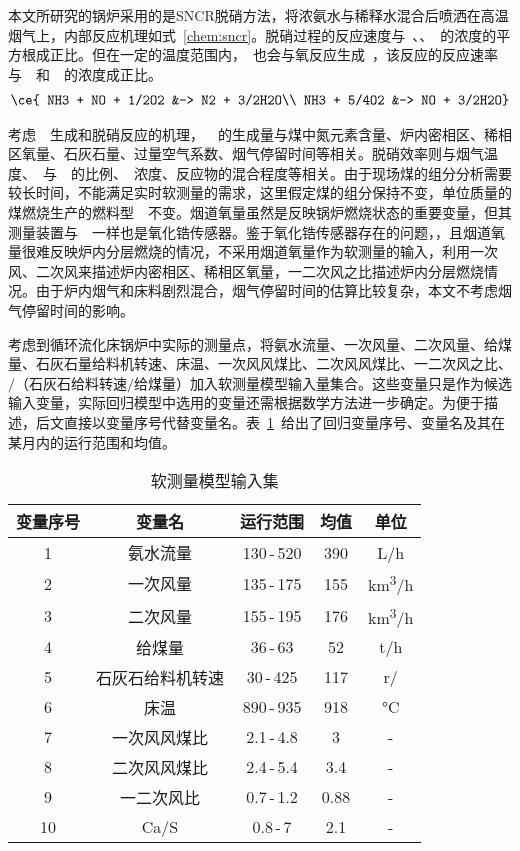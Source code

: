 本文所研究的锅炉采用的是SNCR脱硝方法，将浓氨水与稀释水混合后喷洒在高温烟气上，内部反应机理如式~\ref{chem:sncr}。脱硝过程的反应速度与~、、~的浓度的平方根成正比。但在一定的温度范围内，~也会与氧反应生成~，该反应的反应速率与~~和~~的浓度成正比。
\begin{align}
\label{chem:sncr}
\begin{split}
\ce{
NH3 + NO + 1/2O2 &-> N2 + 3/2H2O\\
NH3 + 5/4O2 &-> NO + 3/2H2O}
\end{split}
\end{align}

考虑~~生成和脱硝反应的机理，~~的生成量与煤中氮元素含量、炉内密相区、稀相区氧量、石灰石量、过量空气系数、烟气停留时间等相关。脱硝效率则与烟气温度、~与~~的比例、~浓度、反应物的混合程度等相关。由于现场煤的组分分析需要较长时间，不能满足实时软测量的需求，这里假定煤的组分保持不变，单位质量的煤燃烧生产的燃料型~~不变。烟道氧量虽然是反映锅炉燃烧状态的重要变量，但其测量装置与~~一样也是氧化锆传感器。鉴于氧化锆传感器存在的问题，，且烟道氧量很难反映炉内分层燃烧的情况，不采用烟道氧量作为软测量的输入，利用一次风、二次风来描述炉内密相区、稀相区氧量，一二次风之比描述炉内分层燃烧情况。由于炉内烟气和床料剧烈混合，烟气停留时间的估算比较复杂，本文不考虑烟气停留时间的影响。

考虑到循环流化床锅炉中实际的测量点，将氨水流量、一次风量、二次风量、给煤量、石灰石量给料机转速、床温、一次风风煤比、二次风风煤比、一二次风之比、$/$（石灰石给料转速$/$给煤量）加入软测量模型输入量集合。这些变量只是作为候选输入变量，实际回归模型中选用的变量还需根据数学方法进一步确定。为便于描述，后文直接以变量序号代替变量名。表~\ref{tab:nox_input}~给出了回归变量序号、变量名及其在某月内的运行范围和均值。

\begingroup
\renewcommand*{\arraystretch}{1.67}
\begin{table}[!h]
\small
\centering
\caption[软测量模型输入集]{软测量模型输入集} \label{tab:nox_input}
\begin{tabular}{ccccc}
\hline\hline 
变量序号	&变量名	&运行范围	&均值	&单位\\
\hline
1	&氨水流量&	130$\,$-$\,$520&	390	&\si{L/h}\\
2	&一次风量&135$\,$-$\,$175	&155	&\si{km^3/h}\\
3	&二次风量&	155$\,$-$\,$195	&176	&\si{km^3/h}\\
4	&给煤量	&36$\,$-$\,$63	&52	&\si{t/h}\\
5	&石灰石给料机转速	&30$\,$-$\,$425	&117	&\si{r/\min}\\
6	&床温	&890$\,$-$\,$935	&918	&\si{\degreeCelsius}\\
7	&一次风风煤比	&2.1$\,$-$\,$4.8	&3	&-\\
8	&二次风风煤比	&2.4$\,$-$\,$5.4	&3.4	&-\\
9	&一二次风比&	0.7$\,$-$\,$1.2	&0.88	&-\\
10	&Ca/S	&0.8$\,$-$\,$7	&2.1	&-\\
\hline\hline
\end{tabular}
\end{table}
\endgroup

